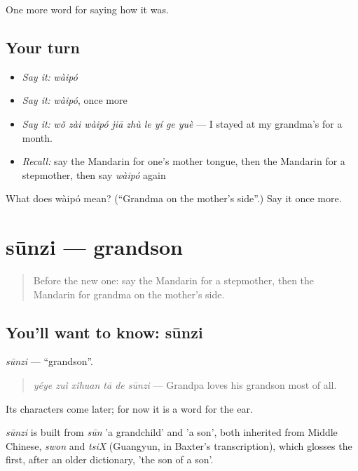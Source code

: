 \begin{grammarlens}[title={What you've built}]
One more word for saying how it was.
\end{grammarlens}

\subsection*{Your turn}
\begin{itemize}
\raggedright
  \item \emph{Say it:} \emph{wàipó}
  \item \emph{Say it:} \emph{wàipó}, once more
  \item \emph{Say it:} \emph{wǒ zài wàipó jiā zhù le yí ge yuè} — I stayed at my grandma's for a month.
  \item \emph{Recall:} say the Mandarin for one's mother tongue, then the Mandarin for a stepmother, then say \emph{wàipó} again
\end{itemize}

\begin{tcolorbox}[breakable,colback=teal!4,colframe=teal!35!black,title={Before you move on}]
What does wàipó mean? (\textquotedblleft{}Grandma on the mother's side\textquotedblright{}.) Say it once more.
\end{tcolorbox}
\section[sūnzi]{sūnzi — grandson}

\label{lesson:ZH-C510-sunzi}



\begin{quote}
Before the new one: say the Mandarin for a stepmother, then the Mandarin for grandma on the mother's side.
\end{quote}

\subsection*{You'll want to know: sūnzi}
\emph{sūnzi} — \textquotedblleft{}grandson\textquotedblright{}.

\begin{quote}
\emph{yéye zuì xǐhuan tā de sūnzi} — Grandpa loves his grandson most of all.
\end{quote}

Its characters come later; for now it is a word for the ear.

\begin{cousinweb}
\emph{sūnzi} is built from \emph{sūn} 'a grandchild' and  'a son', both inherited from Middle Chinese, \emph{swon} and \emph{tsiX} (Guangyun, in Baxter's transcription), which glosses the first, after an older dictionary, 'the son of a son'.
\end{cousinweb}

